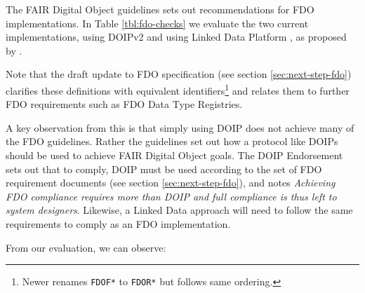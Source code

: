\documentclass[fleqn,10pt,lineno]{wlpeerjlua}
\begin{document}
The FAIR Digital Object guidelines \autocite{boninoFAIRDigitalObject} sets out recommendations for FDO implementations. In Table \ref{tbl:fdo-checks} we evaluate the two current implementations, using DOIPv2 \autocite{foundationDigitalObjectInterface} and using Linked Data Platform \autocite{w3-ldp}, as proposed by \autocite{FDOFramework}.



Note that the draft update to FDO specification \autocite{fdo-RequirementSpec} (see section \ref{sec:next-step-fdo}) clarifies these definitions with equivalent identifiers\footnote{Newer \autocite{fdo-RequirementSpec} renames \texttt{FDOF*} to \texttt{FDOR*} but follows same ordering.} and relates them to further FDO requirements such as FDO Data Type Registries.

A key observation from this is that simply using DOIP does not achieve many of the FDO guidelines. Rather the guidelines set out how a protocol like DOIPs should be used to achieve FAIR Digital Object goals. The DOIP Endorsement \autocite{fdo-DOIPEndorsement} sets out that to comply, DOIP must be used according to the set of FDO requirement documents (see section \ref{sec:next-step-fdo}), and notes \emph{Achieving FDO compliance requires more than DOIP and full compliance is thus left to system designers}. Likewise, a Linked Data approach will need to follow the same requirements to comply as an FDO implementation.

From our evaluation, we can observe:
\end{document}
